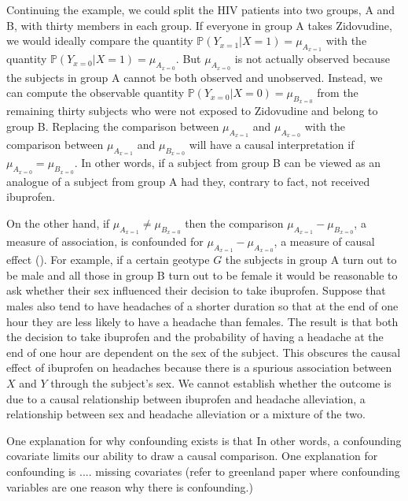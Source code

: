 \documentclass[11pt]{article}
\begin{document}
Continuing the example, we could split the HIV patients into two groups,
A and B, with thirty members in each group. If everyone in group A takes
Zidovudine, we would ideally compare the quantity
\(\mathbb{P}(Y_{x = 1}|X = 1) = \mu_{A_{x = 1}}\) with the quantity
\(\mathbb{P}(Y_{x = 0}|X = 1) = \mu_{A_{x = 0}}\). But
\(\mu_{A_{x = 0}}\) is not actually observed because the subjects in
group A cannot be both observed and unobserved. Instead, we can compute
the observable quantity \(\mathbb{P}(Y_{x = 0}|X = 0) = \mu_{B_{x=0}}\)
from the remaining thirty subjects who were not exposed to Zidovudine
and belong to group B. Replacing the comparison between
\(\mu_{A_{x = 1}}\) and \(\mu_{A_{x = 0}}\) with the comparison between
\(\mu_{A_{x = 1}}\) and \(\mu_{B_{x=0}}\) will have a causal
interpretation if \(\mu_{A_{x = 0}} = \mu_{B_{x=0}}\). In other words,
if a subject from group B can be viewed as an analogue of a subject from
group A had they, contrary to fact, not received ibuprofen. \linebreak

On the other hand, if \(\mu_{A_{x = 1}} \neq \mu_{B_{x=0}}\) then the
comparison \(\mu_{A_{x = 1}} - \mu_{B_{x=0}}\), a measure of
association, is confounded for \(\mu_{A_{x = 1}} - \mu_{A_{x = 0}}\), a
measure of causal effect (\citet{Greenland1999}). For example, if a
certain geotype \(G\) the subjects in group A turn out to be male and
all those in group B turn out to be female it would be reasonable to ask
whether their sex influenced their decision to take ibuprofen. Suppose
that males also tend to have headaches of a shorter duration so that at
the end of one hour they are less likely to have a headache than
females. The result is that both the decision to take ibuprofen and the
probability of having a headache at the end of one hour are dependent on
the sex of the subject. This obscures the causal effect of ibuprofen on
headaches because there is a spurious association between \(X\) and
\(Y\) through the subject's sex. We cannot establish whether the outcome
is due to a causal relationship between ibuprofen and headache
alleviation, a relationship between sex and headache alleviation or a
mixture of the two. \linebreak

One explanation for why confounding exists is that In other words, a
confounding covariate limits our ability to draw a causal comparison.
One explanation for confounding is .... missing covariates (refer to
greenland paper where confounding variables are one reason why there is
confounding.)
\end{document}
